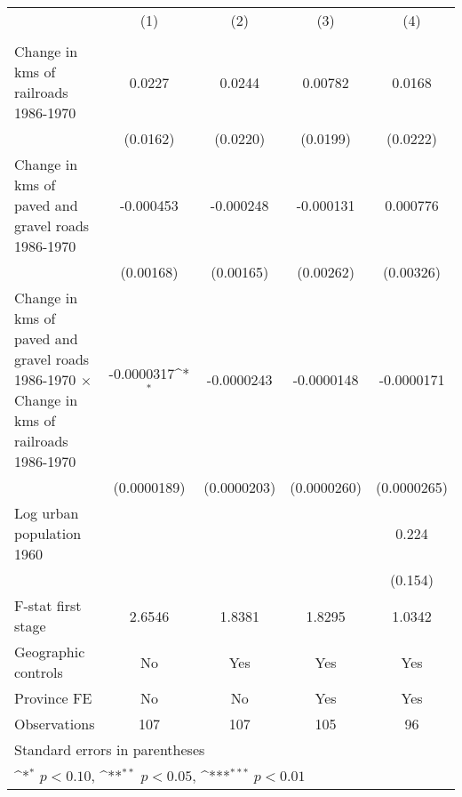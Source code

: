 {
\def\sym#1{\ifmmode^{#1}\else\(^{#1}\)\fi}
\begin{tabular}{l*{4}{c}}
\hline\hline
                &\multicolumn{1}{c}{(1)}&\multicolumn{1}{c}{(2)}&\multicolumn{1}{c}{(3)}&\multicolumn{1}{c}{(4)}\\
                &\multicolumn{1}{c}{}&\multicolumn{1}{c}{}&\multicolumn{1}{c}{}&\multicolumn{1}{c}{}\\
\hline
Change in kms of railroads 1986-1970&   0.0227         &   0.0244         &  0.00782         &   0.0168         \\
                & (0.0162)         & (0.0220)         & (0.0199)         & (0.0222)         \\
[1em]
Change in kms of paved and gravel roads 1986-1970&-0.000453         &-0.000248         &-0.000131         & 0.000776         \\
                &(0.00168)         &(0.00165)         &(0.00262)         &(0.00326)         \\
[1em]
Change in kms of paved and gravel roads 1986-1970 $\times$ Change in kms of railroads 1986-1970&-0.0000317\sym{*}  &-0.0000243         &-0.0000148         &-0.0000171         \\
                &(0.0000189)         &(0.0000203)         &(0.0000260)         &(0.0000265)         \\
[1em]
Log urban population 1960&                  &                  &                  &    0.224         \\
                &                  &                  &                  &  (0.154)         \\
\hline
F-stat first stage&   2.6546         &   1.8381         &   1.8295         &   1.0342         \\
Geographic controls&       No         &      Yes         &      Yes         &      Yes         \\
Province FE     &       No         &       No         &      Yes         &      Yes         \\
Observations    &      107         &      107         &      105         &       96         \\
\hline\hline
\multicolumn{5}{l}{\footnotesize Standard errors in parentheses}\\
\multicolumn{5}{l}{\footnotesize \sym{*} \(p<0.10\), \sym{**} \(p<0.05\), \sym{***} \(p<0.01\)}\\
\end{tabular}
}
